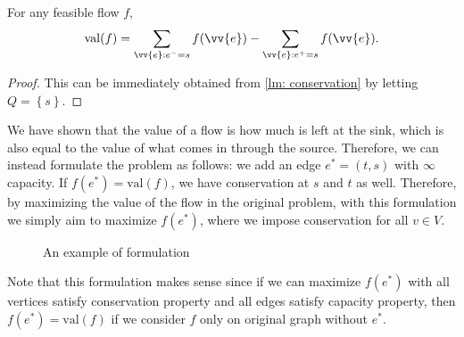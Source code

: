 \begin{corollary}
    For any feasible flow \(f\),
    \[
        \mathrm{val}(f) = \sum_{\vv{e}: e^- = s} f( \vv{e}) - \sum_{\vv{e}: e^+ = s} f(\vv{e}).   
    \]
\end{corollary}

\begin{proof}
    This can be immediately obtained from \autoref{lm: conservation} by letting \(Q = \left\{ s \right\} \). 
\end{proof}

\begin{remark}
    We have shown that the value of a flow is how much is left at the sink, which is also equal to the value of what comes in through the source. Therefore, we can instead formulate the problem as follows: we add an edge \(e^* = (t, s)\) with \(\infty\) capacity. If \(f(e^*) = \mathrm{val}(f) \), we have conservation at \(s\) and \(t\) as well. Therefore, by maximizing the value of the flow in the original problem, with this formulation we simply aim to maximize \(f(e^*)\), where we impose conservation for all \(v \in V\).  

    \begin{figure}[H]
        \centering
        \caption{An example of formulation}
    \end{figure}
    Note that this formulation makes sense since if we can maximize \(f(e^*)\) with all vertices satisfy conservation property and all edges satisfy capacity property, then \(f(e^*) = \mathrm{val}(f)\) if we consider \(f\) only on original graph without \(e^*\).    
\end{remark}

